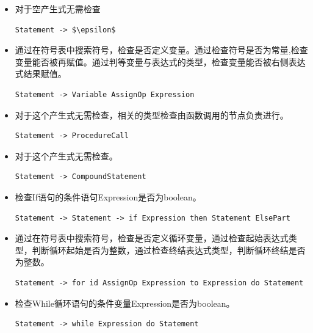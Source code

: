 \documentclass[../main.tex]{subfiles}
\begin{document}
\begin{itemize}
    \item 对于空产生式无需检查
    
    \begin{lstlisting}[style=grammar]
        Statement -> $\epsilon$
    \end{lstlisting}
    
    \item 通过在符号表中搜索符号，检查是否定义变量。通过检查符号是否为常量,检查变量能否被再赋值。通过判等变量与表达式的类型，检查变量能否被右侧表达式结果赋值。

    \begin{lstlisting}[style=grammar]
        Statement -> Variable AssignOp Expression
    \end{lstlisting}
    
    \item 对于这个产生式无需检查，相关的类型检查由函数调用的节点负责进行。

    \begin{lstlisting}[style=grammar]
        Statement -> ProcedureCall
    \end{lstlisting}
    
    \item 对于这个产生式无需检查。

    \begin{lstlisting}[style=grammar]
        Statement -> CompoundStatement
    \end{lstlisting}
    
    \item 检查If语句的条件语句Expression是否为boolean。

    \begin{lstlisting}[style=grammar]
        Statement -> Statement -> if Expression then Statement ElsePart
    \end{lstlisting}
    
    \item 通过在符号表中搜索符号，检查是否定义循环变量，通过检查起始表达式类型，判断循环起始是否为整数，通过检查终结表达式类型，判断循环终结是否为整数。 
    
    \begin{lstlisting}[style=grammar]
        Statement -> for id AssignOp Expression to Expression do Statement
    \end{lstlisting}
    
    \item 检查While循环语句的条件变量Expression是否为boolean。

    \begin{lstlisting}[style=grammar]
        Statement -> while Expression do Statement
    \end{lstlisting}
\end{itemize}
\end{document}
